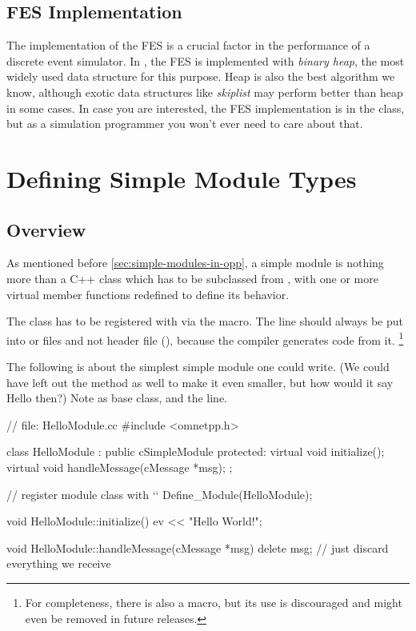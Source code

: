 \subsection{FES Implementation}
\label{sec:simple-modules:fes-implementation}

The implementation of the FES is a crucial factor in the
performance of a discrete event simulator. In {\opp}, the FES is
implemented with \textit{binary heap}, the most
widely used data structure for this purpose. Heap is also the best
algorithm we know, although exotic data structures like
\textit{skiplist} may perform better than heap in some
cases. In case you are interested, the FES implementation is in the
 class, but as a simulation programmer you won't
ever need to care about that.





\section{Defining Simple Module Types}
\label{sec:simple-modules:defining-simple-modules}

\subsection{Overview}

As mentioned before \ref{sec:simple-modules-in-opp}, a simple module
is nothing more than a C++ class which has to be subclassed from
, with one or more virtual member functions redefined
to define its behavior.

The class has to be registered with {\opp} via the  macro.
The  line should always be put into  or 
files and not header file (), because the compiler generates code from it.
      \footnote{For completeness, there is also a 
                macro, but its use is discouraged and might even be removed in
                future {\opp} releases.}

The following  is about the simplest simple module one could write.
(We could have left out the  method as well to make it even smaller,
but how would it say Hello then?) Note  as base class,
and the  line.

\begin{cpp}
// file: HelloModule.cc
#include <omnetpp.h>

class HelloModule : public cSimpleModule
{
  protected:
    virtual void initialize();
    virtual void handleMessage(cMessage *msg);
};

// register module class with `\opp`
Define_Module(HelloModule);

void HelloModule::initialize()
{
    ev << "Hello World!\n";
}

void HelloModule::handleMessage(cMessage *msg)
{
    delete msg; // just discard everything we receive
}
\end{cpp}

